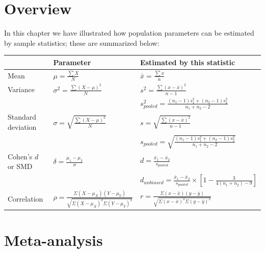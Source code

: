 \documentclass[
]{krantz}
\begin{document}
\hypertarget{overview-2}{%
\section{Overview}\label{overview-2}}

In this chapter we have illustrated how population parameters can be estimated by sample statistics; these are summarized below:

\doublespacing

\begin{longtable}[]{@{}
  >{\raggedright\arraybackslash}p{}
  >{\raggedright\arraybackslash}p{}
  >{\raggedright\arraybackslash}p{}@{}}
\toprule
& Parameter & Estimated by this statistic \\
\midrule
\endhead
Mean & \(\mu = \frac{\sum{X}}{N}\) & \(\bar{x} = \frac{\sum{x}}{n}\) \\
Variance & \(\sigma^2 = \frac{\sum{(X - \mu)^2}}{N}\) & \(s^2 = \frac{\sum{(x - \bar{x})^2}}{n-1}\) \\
& & \(s_{pooled}^2 = \frac{(n_1 -1)s_1^2 + (n_2 -1)s_2^2}{n_1 + n_2-2}\) \\
Standard deviation & \(\sigma = \sqrt{\frac{\sum{(X - \mu)^2}}{N}}\) & \(s =\sqrt{\frac{\sum{(x - \bar{x})^2}}{n-1}}\) \\
& & \(s_{pooled} = \sqrt{\frac{(n_1 -1)s_1^2 + (n_2 -1)s_2^2}{n_1 + n_2-2}}\) \\
Cohen's \(d\) or SMD & \(\delta= \frac{\mu_{1} - \mu_{2}}{\sigma}\) & \(d = \frac{\bar{x}_{1} - \bar{x}_{2}}{s_{pooled}}\) \\
& & \(d_{unbiased} = \frac{\bar{x}_{1} - \bar{x}_{2}}{s_{pooled}} \times [1 - \frac{3}{4(n_1 + n_2)-9}]\) \\
Correlation & \(\rho = \frac{\Sigma (X - \mu_X)(Y - \mu_Y)}{\sqrt{\Sigma (X - \mu_X)^2\Sigma (Y - \mu_Y)^2}}\) & \(r = \frac{\Sigma (x - \bar{x})(y - \bar{y})}{\sqrt{\Sigma (x - \bar{x})^2\Sigma (y - \bar{y})^2}}\) \\
\bottomrule
\end{longtable}

\singlespacing

\hypertarget{meta-analysis}{%
\section{Meta-analysis}\label{meta-analysis}}
\end{document}
